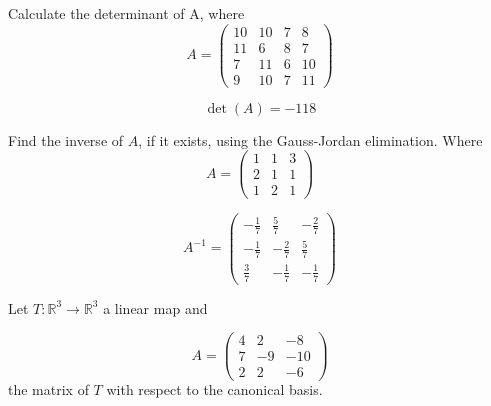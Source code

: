 \begin{questions}

\question Calculate the determinant of A, where
$$
A=\left(\begin{array}{rrrr}
10 & 10 & 7 & 8 \\
11 & 6 & 8 & 7 \\
7 & 11 & 6 & 10 \\
9 & 10 & 7 & 11
\end{array}\right)
$$

\begin{solution}
$$\det(A)=-118$$
\end{solution}

\question Find the inverse of $A$, if it exists, using the Gauss-Jordan elimination. Where
$$
A=\left(\begin{array}{rrr}
1 & 1 & 3 \\
2 & 1 & 1 \\
1 & 2 & 1
\end{array}\right)
$$

\begin{solution}
$$A^{-1}=\left(\begin{array}{rrr}
-\frac{1}{7} & \frac{5}{7} & -\frac{2}{7} \\
-\frac{1}{7} & -\frac{2}{7} & \frac{5}{7} \\
\frac{3}{7} & -\frac{1}{7} & -\frac{1}{7}
\end{array}\right)$$
\end{solution}

\question Let $T:\mathbb{R}^3\rightarrow\mathbb{R}^3$  a linear map and
 
$$
A=\left(\begin{array}{rrr}
4 & 2 & -8 \\
7 & -9 & -10 \\
2 & 2 & -6
\end{array}\right)
$$
the matrix of $T$ with respect to the canonical basis.
\end{questions}
